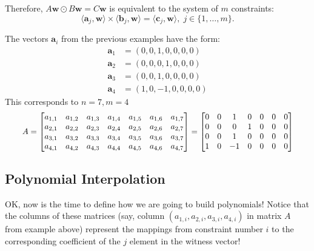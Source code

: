 \documentclass[../lecture-notes-148x210.tex]{subfiles}
\begin{document}
Therefore, $A\mathbf{w} \odot B\mathbf{w} = C\mathbf{w}$ is equivalent to the system of $m$ constraints:
\begin{equation*}
    \langle \mathbf{a}_j, \mathbf{w}\rangle \times \langle \mathbf{b}_j, \mathbf{w} \rangle = \langle \mathbf{c}_j, \mathbf{w} \rangle, \; j \in \{1,\dots,m\}.
\end{equation*}

\begin{example}
    The vectors $\mathbf{a}_i$ from the previous examples have the form:
    \begin{align*}
        \mathbf{a}_1 &= (0, 0, 1, 0, 0, 0, 0) \\
        \mathbf{a}_2 &= (0, 0, 0, 1, 0, 0, 0) \\
        \mathbf{a}_3 &= (0, 0, 1, 0, 0, 0, 0) \\
        \mathbf{a}_4 &= (1, 0, -1, 0, 0, 0, 0)
    \end{align*}
    This corresponds to $n = 7, m = 4$
    \begin{equation*}
        \scalebox{0.95}{$
        A = \begin{bmatrix}
            a_{1,1} & a_{1,2} & a_{1,3} & a_{1,4} & a_{1,5} & a_{1,6} & a_{1,7} \\
            a_{2,1} & a_{2,2} & a_{2,3} & a_{2,4} & a_{2,5} & a_{2,6} & a_{2,7} \\
            a_{3,1} & a_{3,2} & a_{3,3} & a_{3,4} & a_{3,5} & a_{3,6} & a_{3,7} \\
            a_{4,1} & a_{4,2} & a_{4,3} & a_{4,4} & a_{4,5} & a_{4,6} & a_{4,7}
        \end{bmatrix} = \begin{bmatrix}
            0 & 0 & 1 & 0 & 0 & 0 & 0 \\
            0 & 0 & 0 & 1 & 0 & 0 & 0 \\
            0 & 0 & 1 & 0 & 0 & 0 & 0 \\
            1 & 0 & -1 & 0 & 0 & 0 & 0 
        \end{bmatrix}
        $}
    \end{equation*}
\end{example}

\subsection{Polynomial Interpolation}

OK, now is the time to define how we are going to build polynomials! Notice that the columns of these matrices (say, column $(a_{1,i},a_{2,i},a_{3,i},a_{4,i})$ in matrix $A$ from example above) represent the mappings from constraint number $i$ to the corresponding
coefficient of the $j$ element in the witness vector!
\end{document}

